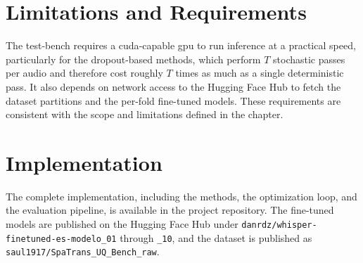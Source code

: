 \section{Limitations and Requirements}

The test-bench requires a \acrshort{cuda}-capable \acrshort{gpu} to run inference at a practical speed, particularly for the dropout-based methods, which perform $T$ stochastic passes per audio and therefore cost roughly $T$ times as much as a single deterministic pass. It also depends on network access to the Hugging Face Hub to fetch the dataset partitions and the per-fold fine-tuned models. These requirements are consistent with the scope and limitations defined in the  chapter.

\section{Implementation}

The complete implementation, including the methods, the optimization loop, and the evaluation pipeline, is available in the project repository. The fine-tuned models are published on the Hugging Face Hub under \texttt{danrdz/whisper-finetuned-es-modelo\_01} through \texttt{\_10}, and the dataset is published as \texttt{saul1917/SpaTrans\_UQ\_Bench\_raw}.
